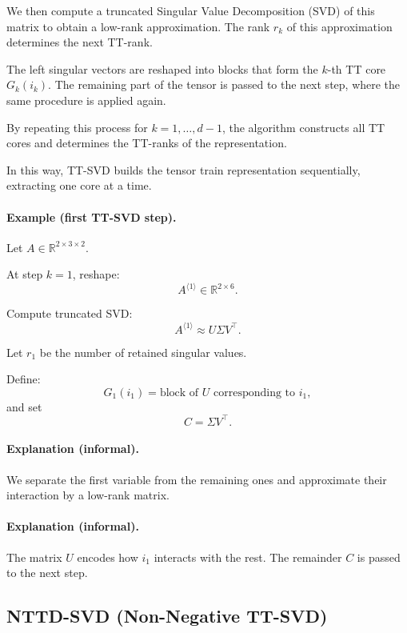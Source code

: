 \documentclass[11pt,a4paper,parskip=half-]{scrartcl}
\theoremstyle{definition}
\theoremstyle{plain}
\theoremstyle{remark}
\begin{document}
We then compute a truncated Singular Value Decomposition (SVD)
of this matrix to obtain a low-rank approximation.
The rank $r_k$ of this approximation determines the next
TT-rank.

The left singular vectors are reshaped into blocks that form
the $k$-th TT core $G_k(i_k)$.
The remaining part of the tensor is passed to the next step,
where the same procedure is applied again.

By repeating this process for $k = 1,\dots,d-1$,
the algorithm constructs all TT cores and determines
the TT-ranks of the representation.

In this way, TT-SVD builds the tensor train representation
sequentially, extracting one core at a time.

\paragraph{Example (first TT-SVD step).}
Let $A \in \mathbb{R}^{2 \times 3 \times 2}$.

At step $k = 1$, reshape:
\[
A^{\langle 1 \rangle} \in \mathbb{R}^{2 \times 6}.
\]

Compute truncated SVD:
\[
A^{\langle 1 \rangle} \approx U \Sigma V^\top.
\]

Let $r_1$ be the number of retained singular values.

Define:
\[
G_1(i_1) = \text{block of } U \text{ corresponding to } i_1,
\]
and set
\[
C = \Sigma V^\top.
\]

\paragraph{Explanation (informal).}
We separate the first variable from the remaining ones and approximate their
interaction by a low-rank matrix.

\paragraph{Explanation (informal).}
The matrix $U$ encodes how $i_1$ interacts with the rest. The remainder $C$
is passed to the next step.

\subsection{NTTD-SVD (Non-Negative TT-SVD)}
\label{sec:nttd_svd}
\end{document}

